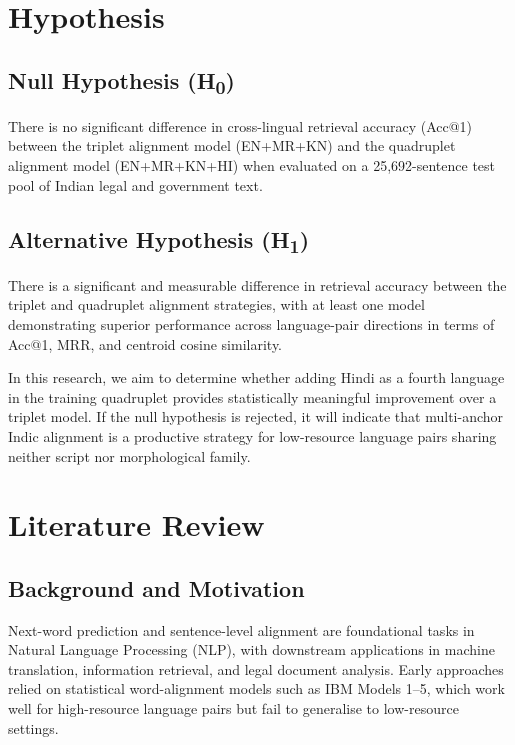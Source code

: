 \documentclass[conference,letterpaper]{IEEEtran}
\begin{document}
\vspace{0.5cm}

\section{Hypothesis}

\subsection{Null Hypothesis (H\textsubscript{0})}
There is no significant difference in cross-lingual retrieval accuracy
(Acc@1) between the triplet alignment model (EN+MR+KN) and the quadruplet
alignment model (EN+MR+KN+HI) when evaluated on a 25,692-sentence test pool
of Indian legal and government text.

\subsection{Alternative Hypothesis (H\textsubscript{1})}
There is a significant and measurable difference in retrieval accuracy
between the triplet and quadruplet alignment strategies, with at least one
model demonstrating superior performance across language-pair directions in
terms of Acc@1, MRR, and centroid cosine similarity.

In this research, we aim to determine whether adding Hindi as a fourth
language in the training quadruplet provides statistically meaningful
improvement over a triplet model. If the null hypothesis is rejected, it
will indicate that multi-anchor Indic alignment is a productive strategy
for low-resource language pairs sharing neither script nor morphological
family.

\vspace{0.5cm}

\section{Literature Review}

\subsection{Background and Motivation}
Next-word prediction and sentence-level alignment are foundational tasks in
Natural Language Processing (NLP), with downstream applications in machine
translation, information retrieval, and legal document analysis. Early
approaches relied on statistical word-alignment models such as IBM Models
1--5, which work well for high-resource language pairs but fail to generalise
to low-resource settings.
\end{document}
